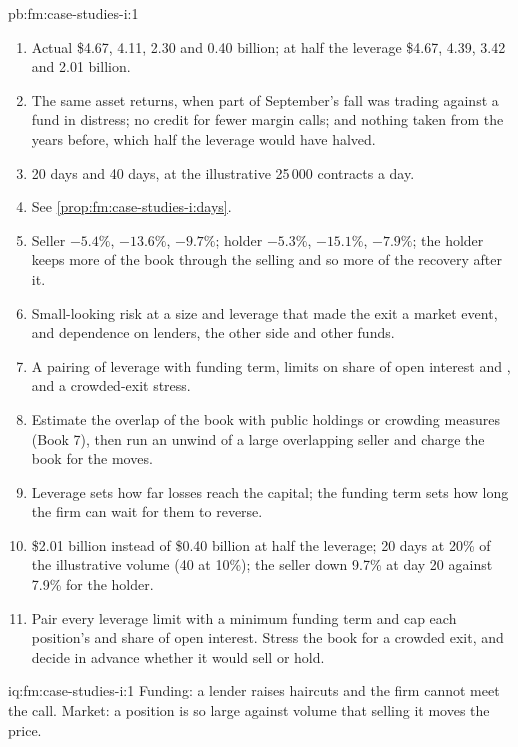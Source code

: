 \begin{solution}{pb:fm:case-studies-i:1}
\begin{enumerate}
\item Actual \$4.67, 4.11, 2.30 and 0.40 billion; at half the leverage \$4.67, 4.39, 3.42 and 2.01 billion.
\item The same asset returns, when part of September's fall was trading against a fund in distress; no credit for fewer margin calls; and nothing taken
from the years before, which half the leverage would have halved.
\item 20 days and 40 days, at the illustrative 25\,000 contracts a day.
\item See \cref{prop:fm:case-studies-i:days}.
\item Seller $-5.4\%$, $-13.6\%$, $-9.7\%$; holder $-5.3\%$, $-15.1\%$, $-7.9\%$; the holder keeps more of the book through the selling and so more of the
recovery after it.
\item Small-looking risk at a size and leverage that made the exit a market event, and dependence on lenders, the other side and other funds.
\item A pairing of leverage with funding term, limits on share of open interest and , and a crowded-exit stress.
\item Estimate the overlap of the book with public holdings or crowding measures (Book 7), then run an unwind of a large overlapping seller and
charge the book for the moves.
\item Leverage sets how far losses reach the capital; the funding term sets how long the firm can wait for them to reverse.
\item \$2.01 billion instead of \$0.40 billion at half the leverage; 20 days at 20\% of the illustrative volume (40 at 10\%); the seller down 9.7\% at day
20 against 7.9\% for the holder.
\item Pair every leverage limit with a minimum funding term and cap each position's  and share of open interest. Stress the book for a
crowded exit, and decide in advance whether it would sell or hold.
\end{enumerate}
\end{solution}

\begin{solution}{iq:fm:case-studies-i:1}
Funding: a lender raises haircuts and the firm cannot meet the call. Market: a position is so large against volume that selling it moves the price.
\end{solution}

